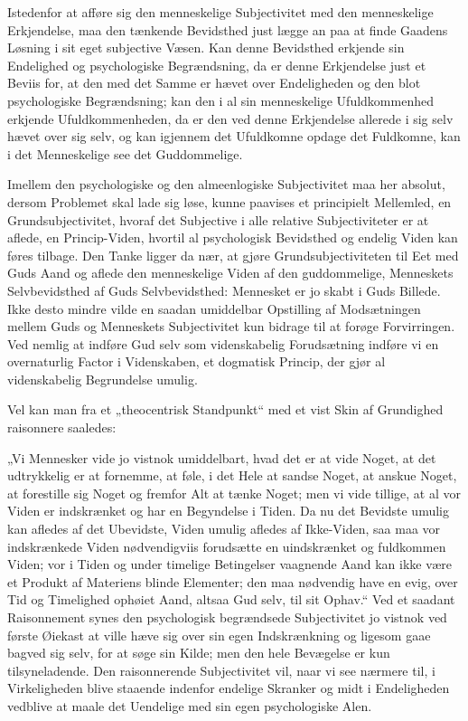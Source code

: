 \documentclass[11pt]{book}
\newcommand{\opage}[1]{\marginnote{\footnotesize\textit{[#1]}}}
\begin{document}
Istedenfor at afføre sig den menneskelige Subjectivitet med den
menneskelige Erkjendelse, maa den tænkende Bevidsthed just lægge an
paa at finde Gaadens Løsning i sit eget subjective Væsen. Kan denne
Bevidsthed erkjende sin Endelighed og psychologiske Begrændsning, da
er denne Erkjendelse just et Beviis for, at den med det Samme er
hævet over Endeligheden og den blot psychologiske Begrændsning; kan
den i al sin menneskelige Ufuldkommenhed erkjende Ufuldkommenheden,
da er den ved denne Erkjendelse allerede i sig selv hævet over sig
selv, og kan igjennem det Ufuldkomne opdage det Fuldkomne, kan i det
Menneskelige see det Guddommelige.

Imellem den psychologiske og den almeenlogiske Subjectivitet maa her
absolut, dersom Problemet skal lade sig løse, kunne paavises et
principielt Mellemled, en Grundsubjectivitet, hvoraf det Subjective
i alle relative Subjectiviteter er at aflede, en Princip-Viden,
hvortil al psychologisk Bevidsthed og endelig Viden kan føres
tilbage. Den Tanke ligger da nær, at gjøre Grundsubjectiviteten til
Eet med Guds Aand og aflede den menneskelige Viden af den
guddommelige, Menneskets Selvbevidsthed af Guds Selvbevidsthed:
Mennesket er jo skabt i Guds Billede. Ikke desto mindre vilde en
saadan umiddelbar Opstilling af Modsætningen mellem Guds og
Menneskets Subjectivitet kun bidrage til at forøge Forvirringen. Ved
nemlig at indføre Gud selv som videnskabelig Forudsætning indføre vi
en overnaturlig Factor i Videnskaben, et dogmatisk Princip, der gjør
al videnskabelig Begrundelse umulig.

Vel kan man fra et „theocentrisk Standpunkt“ med et vist Skin af
Grundighed raisonnere saaledes:

\opage{43} \setcounter{footnote}{0}%
\noindent „Vi Mennesker vide jo vistnok umiddelbart, hvad det er at
vide Noget, at det udtrykkelig er at fornemme, at føle, i det Hele
at sandse Noget, at anskue Noget, at forestille sig Noget og fremfor
Alt at tænke Noget; men vi vide tillige, at al vor Viden er
indskrænket og har en Begyndelse i Tiden. Da nu det Bevidste umulig
kan afledes af det Ubevidste, Viden umulig afledes af Ikke-Viden,
saa maa vor indskrænkede Viden nødvendigviis forudsætte en
uindskrænket og fuldkommen Viden; vor i Tiden og under timelige
Betingelser vaagnende Aand kan ikke være et Produkt af Materiens
blinde Elementer; den maa nødvendig have en evig, over Tid og
Timelighed ophøiet Aand, altsaa Gud selv, til sit Ophav.“ Ved et
saadant Raisonnement synes den psychologisk begrændsede
Subjectivitet jo vistnok ved første Øiekast at ville hæve sig over
sin egen Indskrænkning og ligesom gaae bagved sig selv, for at søge
sin Kilde; men den hele Bevægelse er kun tilsyneladende. Den
raisonnerende Subjectivitet vil, naar vi see nærmere til, i
Virkeligheden blive staaende indenfor endelige Skranker og midt i
Endeligheden vedblive at maale det Uendelige med sin egen
psychologiske Alen.
\end{document}
